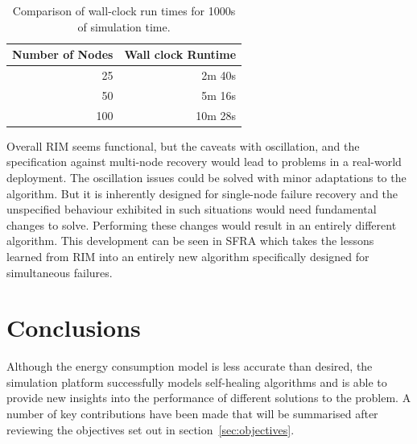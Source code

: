 \documentclass[authoryearcitations]{UoYCSproject}
\begin{document}
\begin{table}[]
\centering
\begin{tabular}{@{}rr@{}}
\toprule
Number of Nodes & Wall clock Runtime \\ \midrule
25              & 2m 40s             \\
50              & 5m 16s             \\
100             & 10m 28s            \\ \bottomrule
\end{tabular}
\caption{Comparison of wall-clock run times for 1000s of simulation time.}
\label{tab:runtimes}
\end{table}


Overall RIM seems functional, but the caveats with oscillation, and the specification against multi-node recovery would lead to problems in a real-world deployment. The oscillation issues could be solved with minor adaptations to the algorithm. But it is inherently designed for single-node failure recovery and the unspecified behaviour exhibited in such situations would need fundamental changes to solve. Performing these changes would result in an entirely different algorithm. This development can be seen in SFRA \citep{Alfadhly2012} which takes the lessons learned from RIM into an entirely new algorithm specifically designed for simultaneous failures.

\chapter{Conclusions}
\label{cha:Conclusion}

%

Although the energy consumption model is less accurate than desired, the simulation platform successfully models self-healing algorithms and is able to provide new insights into the performance of different solutions to the problem. A number of key contributions have been made that will be summarised after reviewing the objectives set out in section~\ref{sec:objectives}.
\end{document}
